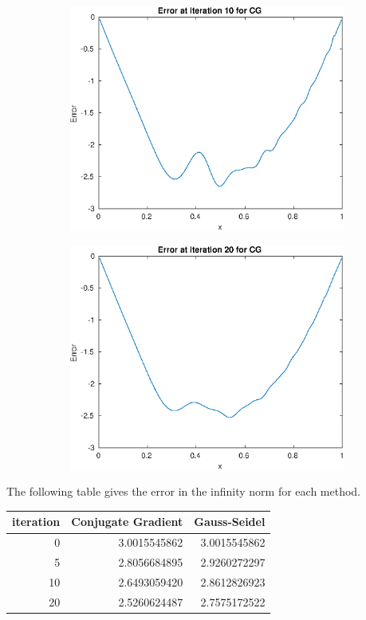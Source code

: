 \documentclass{article}
\begin{document}
\begin{figure}[H]
\begin{subfigure}{0.495\linewidth}
        \includegraphics[width=\linewidth]{CGerr_i=10.eps}
    \end{subfigure}
    \begin{subfigure}{0.495\linewidth}
        \centering
        \includegraphics[width=\linewidth]{CGerr_i=20.eps}
    \end{subfigure}
\end{figure}
The following table gives the error in the infinity norm for each method.
\begin{table}[H]\centering
\begin{tabular}{|r|r|r|}\hline
{iteration}&{Conjugate Gradient}&{Gauss-Seidel}\\\hline
0&3.0015545862     &3.0015545862  \\
5&2.8056684895     &2.9260272297\\
10&2.6493059420&2.8612826923\\
20&2.5260624487&2.7575172522\\\hline
\end{tabular}
\end{table}
\end{document}
